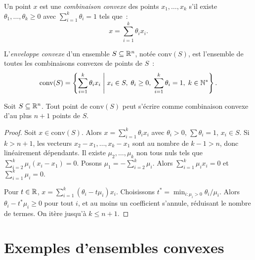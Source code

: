 \begin{definition}
Un point $x$ est une \emph{combinaison convexe} des points $x_1, \ldots, x_k$ s'il
existe $\theta_1, \ldots, \theta_k \geq 0$ avec $\sum_{i=1}^k \theta_i = 1$ tels que~:
\[
    x = \sum_{i=1}^k \theta_i x_i.
\]
\end{definition}

\begin{definition}
L'\emph{enveloppe convexe} d'un ensemble $S \subseteq \mathbb{R}^n$, not\'ee $\mathrm{conv}(S)$,
est l'ensemble de toutes les combinaisons convexes de points de $S$~:
\[
    \mathrm{conv}(S) = \left\{ \sum_{i=1}^k \theta_i x_i \;\middle|\;
    x_i \in S, \; \theta_i \geq 0, \; \sum_{i=1}^k \theta_i = 1, \; k \in \mathbb{N}^* \right\}.
\]
\end{definition}

\begin{theoreme}
\label{thm:caratheodory}
Soit $S \subseteq \mathbb{R}^n$. Tout point de $\mathrm{conv}(S)$ peut s'\'ecrire comme
combinaison convexe d'au plus $n+1$ points de $S$.
\end{theoreme}

\begin{proof}
Soit $x \in \mathrm{conv}(S)$. Alors $x = \sum_{i=1}^k \theta_i x_i$ avec
$\theta_i > 0$, $\sum \theta_i = 1$, $x_i \in S$. Si $k > n+1$, les vecteurs
$x_2 - x_1, \ldots, x_k - x_1$ sont au nombre de $k-1 > n$, donc lin\'eairement
d\'ependants. Il existe $\mu_2, \ldots, \mu_k$ non tous nuls tels que
$\sum_{i=2}^k \mu_i (x_i - x_1) = 0$. Posons $\mu_1 = -\sum_{i=2}^k \mu_i$.
Alors $\sum_{i=1}^k \mu_i x_i = 0$ et $\sum_{i=1}^k \mu_i = 0$.

Pour $t \in \mathbb{R}$, $x = \sum_{i=1}^k (\theta_i - t\mu_i)x_i$. Choisissons
$t^* = \min_{i:\mu_i>0} \theta_i/\mu_i$. Alors $\theta_i - t^*\mu_i \geq 0$
pour tout $i$, et au moins un coefficient s'annule, r\'eduisant le nombre de termes.
On it\`ere jusqu'\`a $k \leq n+1$.
\end{proof}

\section{Exemples d'ensembles convexes}

